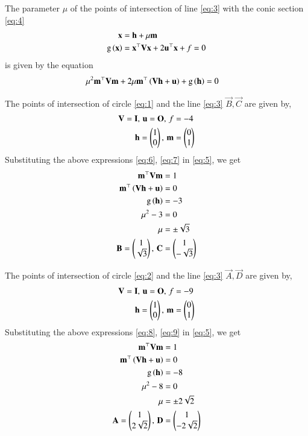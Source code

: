 \documentclass[journal,12pt,twocolumn]{IEEEtran}
\begin{document}
\begin{enumerate}
The parameter $\mu$ of the points of intersection of line \eqref{eq:3} with the conic section \eqref{eq:4}
\begin{align}
\mathbf{x} &= \mathbf{h} + \mu \mathbf{m}
\label{eq:3}\\
\text{g}\left(\mathbf{x}\right) &= \mathbf{x}^{\top}\mathbf{V}\mathbf{x}+2\mathbf{u}^{\top}\mathbf{x}+f=0
\label{eq:4}
\end{align}
is given by the equation 
\begin{align}
\mu^2\mathbf{m}^{\top}\mathbf{V}\mathbf{m} + 2 \mu\mathbf{m}^{\top}\left(\mathbf{V}\mathbf{h}+\mathbf{u}\right) 
	+ \text{g}\left(\mathbf{h}\right) &=0
\label{eq:5}
\end{align}


The points of intersection of circle \eqref{eq:1} and the line \eqref{eq:3} $\vec{B},\vec{C}$ are given by,
\begin{align}
\mathbf{V} = \mathbf{I}, \, \mathbf{u} = \mathbf{O}, \, f &= -4
\label{eq:6}\\
\mathbf{h} = \begin{pmatrix}1\\0\end{pmatrix}, \, \mathbf{m} &= \begin{pmatrix}0\\1\end{pmatrix}
\label{eq:7}
\end{align} 
Substituting the above expressions \eqref{eq:6}, \eqref{eq:7} in \eqref{eq:5}, we get
\begin{align}
\mathbf{m}^{\top}\mathbf{V}\mathbf{m} & = 1\\
\mathbf{m}^{\top}\left(\mathbf{V}\mathbf{h}+\mathbf{u}\right) &= 0 \\
\text{g}\left(\mathbf{h}\right) &= -3\\
\mu ^2 - 3 &= 0\\
\mu &= \pm \sqrt{3}\\
\mathbf{B} = \begin{pmatrix}1\\\sqrt{3}\end{pmatrix}, \, \mathbf{C} &= \begin{pmatrix}1\\-\sqrt{3}\end{pmatrix}
\end{align}

The points of intersection of circle \eqref{eq:2} and the line \eqref{eq:3} $\vec{A},\vec{D}$ are given by,
\begin{align}
\mathbf{V} = \mathbf{I}, \, \mathbf{u} = \mathbf{O}, \, f &= -9
\label{eq:8}\\
\mathbf{h} = \begin{pmatrix}1\\0\end{pmatrix}, \, \mathbf{m} &= \begin{pmatrix}0\\1\end{pmatrix}
\label{eq:9}
\end{align} 
Substituting the above expressions \eqref{eq:8}, \eqref{eq:9} in \eqref{eq:5}, we get
\begin{align}
\mathbf{m}^{\top}\mathbf{V}\mathbf{m} & = 1\\
\mathbf{m}^{\top}\left(\mathbf{V}\mathbf{h}+\mathbf{u}\right) &= 0 \\
\text{g}\left(\mathbf{h}\right) &= -8\\
\mu ^2 - 8 &= 0\\
\mu &= \pm 2\sqrt{2}\\
\mathbf{A} = \begin{pmatrix}1\\2\sqrt{2}\end{pmatrix}, \, \mathbf{D} &= \begin{pmatrix}1\\-2\sqrt{2}\end{pmatrix}
\end{align}


\end{enumerate}
\end{document}
